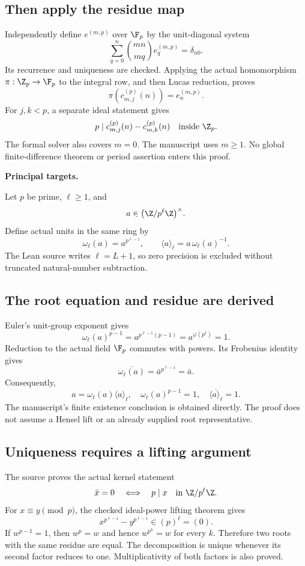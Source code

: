 \subsection*{Then apply the residue map}
Independently define $e^{(m,p)}$ over $\F_p$ by the unit-diagonal system
\[
 \sum_{q=0}^{n}\binom{mn}{mq}e^{(m,p)}_q=\delta_{n0}.
\]
Its recurrence and uniqueness are checked. Applying the actual homomorphism $\pi:\Z_p\to\F_p$ to the integral row, and then Lucas reduction, proves
\[
 \boxed{\pi(c^{(p)}_{m,j}(n))=e^{(m,p)}_n.}
\]
For $j,k<p$, a separate ideal statement gives
\[
 p\mid c^{(p)}_{m,j}(n)-c^{(p)}_{m,k}(n)\quad\text{inside }\Z_p.
\]
The formal solver also covers $m=0$. The manuscript uses $m\geq1$. No global finite-difference theorem or period assertion enters this proof.

\textbf{Principal targets.}\par
{}\par
{}\par
{}
\par\medskip
{}
Let $p$ be prime, $\ell\geq1$, and
\[
 a\in\bigl(\Z/p^\ell\Z\bigr)^\times.
\]
Define actual units in the same ring by
\[
 \boxed{\omega_\ell(a)=a^{p^{\ell-1}},\qquad
 \langle a\rangle_\ell=a\,\omega_\ell(a)^{-1}.}
\]
The Lean source writes $\ell=L+1$, so zero precision is excluded without truncated natural-number subtraction.

\subsection*{The root equation and residue are derived}
Euler's unit-group exponent gives
\[
 \omega_\ell(a)^{p-1}
 =a^{p^{\ell-1}(p-1)}=a^{\varphi(p^\ell)}=1.
\]
Reduction to the actual field $\F_p$ commutes with powers. Its Frobenius identity gives
\[
 \overline{\omega_\ell(a)}
 =\bar a^{p^{\ell-1}}=\bar a.
\]
Consequently,
\[
 \boxed{a=\omega_\ell(a)\langle a\rangle_\ell,\quad
 \omega_\ell(a)^{p-1}=1,\quad
 \overline{\langle a\rangle_\ell}=1.}
\]
The manuscript's finite existence conclusion is obtained directly. The proof does not assume a Hensel lift or an already supplied root representative.

\subsection*{Uniqueness requires a lifting argument}
The source proves the actual kernel statement
\[
 \bar x=0\quad\Longleftrightarrow\quad p\mid x
 \quad\text{in }\Z/p^\ell\Z.
\]
For $x\equiv y\pmod p$, the checked ideal-power lifting theorem gives
\[
 x^{p^{\ell-1}}-y^{p^{\ell-1}}\in(p)^\ell=(0).
\]
If $w^{p-1}=1$, then $w^p=w$ and hence $w^{p^k}=w$ for every $k$. Therefore two roots with the same residue are equal. The decomposition is unique whenever its second factor reduces to one. Multiplicativity of both factors is also proved.

